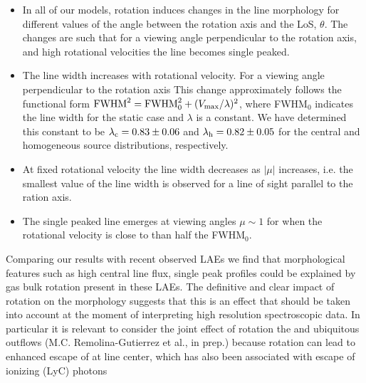 \begin{itemize}
\item In all of our models, rotation induces changes in the line morphology
for different values of the angle between the rotation
axis and the LoS, $\theta$. The changes are such that for
a viewing angle perpendicular to the
rotation axis, and high rotational velocities the line becomes single peaked.
\item The line width increases with rotational
velocity. For a viewing angle perpendicular to the rotation axis
This change approximately follows the functional form ${\rm FWHM}^2
= {\rm FWHM}_{ 0}^2 + (V_{\rm max}/\lambda)^2$, where FWHM$_{0}$
indicates the line
width for the static case and $\lambda$ is a constant. We have
determined this constant to be $\lambda_{\rm c}=0.83 \pm 0.06$ and
$\lambda_{\rm h}=0.82\pm 0.05$ for the central and homogeneous source
distributions, respectively.
\item At fixed rotational velocity the line width decreases as $|\mu|$
increases, i.e. the smallest value of the line width is observed for
a line of sight parallel to the ration axis.
\item The single peaked line emerges at viewing angles $\mu\sim 1$ for
when the rotational velocity is close to than half the FWHM$_0$.
\end{itemize}
Comparing our results with recent observed LAEs we find that
morphological features such as high central line flux, single peak
profiles could be explained by gas bulk rotation present in these
LAEs.
The definitive and clear impact of rotation on the \ly morphology
suggests that this is an effect that should be taken into account at
the moment of interpreting high resolution spectroscopic data. In
particular it is relevant to consider the joint effect of rotation the
and ubiquitous outflows (M.C. Remolina-Gutierrez et al., in prep.)
because rotation can lead to enhanced escape of \ly at line center, which
has also been associated with escape of ionizing (LyC) photons
\citep{Behrens2014,2014arXiv1404.2958V}
